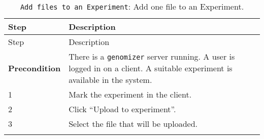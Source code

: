 \begin{longtable}[c]{@{}ll@{}}
\caption{\texttt{Add\ files\ to\ an\ Experiment}: Add one file to an
Experiment.}\tabularnewline
\toprule
\begin{minipage}[b]{0.31\columnwidth}\raggedright\strut
Step
\strut\end{minipage} &
\begin{minipage}[b]{0.63\columnwidth}\raggedright\strut
Description
\strut\end{minipage}\tabularnewline
\midrule
\endfirsthead
\toprule
\begin{minipage}[b]{0.31\columnwidth}\raggedright\strut
Step
\strut\end{minipage} &
\begin{minipage}[b]{0.63\columnwidth}\raggedright\strut
Description
\strut\end{minipage}\tabularnewline
\midrule
\endhead
\begin{minipage}[t]{0.31\columnwidth}\raggedright\strut
\textbf{Precondition}
\strut\end{minipage} &
\begin{minipage}[t]{0.63\columnwidth}\raggedright\strut
There is a \texttt{genomizer} server running. A user is logged in on a
client. A suitable experiment is available in the system.
\strut\end{minipage}\tabularnewline
\begin{minipage}[t]{0.31\columnwidth}\raggedright\strut
1
\strut\end{minipage} &
\begin{minipage}[t]{0.63\columnwidth}\raggedright\strut
Mark the experiment in the client.
\strut\end{minipage}\tabularnewline
\begin{minipage}[t]{0.31\columnwidth}\raggedright\strut
2
\strut\end{minipage} &
\begin{minipage}[t]{0.63\columnwidth}\raggedright\strut
Click ``Upload to experiment''.
\strut\end{minipage}\tabularnewline
\begin{minipage}[t]{0.31\columnwidth}\raggedright\strut
3
\strut\end{minipage} &
\begin{minipage}[t]{0.63\columnwidth}\raggedright\strut
Select the file that will be uploaded.
\strut\end{minipage}\tabularnewline
\begin{minipage}[t]{0.31\columnwidth}\raggedright\strut

\end{minipage}
\end{longtable}
